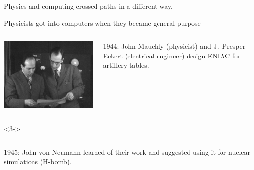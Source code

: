 \documentclass[aspectratio=169]{beamer}
\begin{document}
\begin{frame}{}
\LARGE
\vspace{1.25 cm}
\begin{center}
Physics and computing crossed paths in a different way.
\end{center}
\end{frame}

\begin{frame}{Physicists got into computers when they became general-purpose}
\vspace{0.5 cm}

\begin{columns}
\includegraphics[width=\linewidth]{presper-and-mauchly.jpg}

1944: John Mauchly (physicist) and J.\ Presper Eckert (electrical engineer) design ENIAC for artillery tables.

\vspace{0.25 cm}
\end{columns}

\vspace{0.25 cm}
\begin{uncoverenv}<3->
\begin{columns}
1945: John von Neumann learned of their work and suggested using it for nuclear simulations (H-bomb).

\vspace{0.25 cm}


\end{columns}
\end{uncoverenv}
\end{frame}
\end{document}
